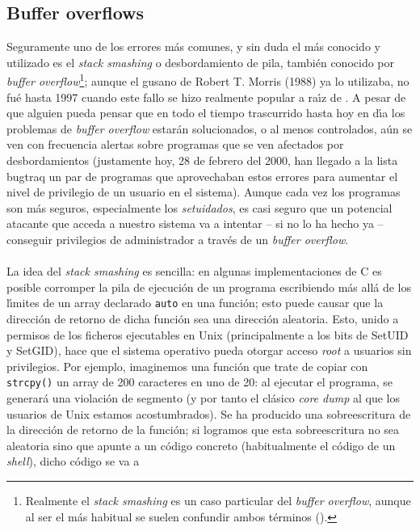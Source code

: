 \subsection{Buffer overflows}
Seguramente uno de los errores m\'as comunes, y sin duda el m\'as conocido y
utilizado es el {\it stack smashing} o desbordamiento de pila, tambi\'en 
conocido por {\it buffer overflow}\footnote{Realmente el {\it stack smashing} es
un caso particular del {\it buffer overflow}, aunque al ser el m\'as habitual
se suelen confundir ambos t\'erminos (\cite{kn:cow98}).}; aunque el gusano
de Robert T. Morris (1988) ya lo utilizaba, no fu\'e hasta 1997 cuando este
fallo se hizo realmente popular a ra\'{\i}z de \cite{kn:ale97}. A pesar de que
alguien pueda pensar que en todo el tiempo trascurrido hasta hoy en d\'{\i}a 
los problemas de {\it buffer overflow} estar\'an solucionados, o al menos 
controlados, a\'un se ven con frecuencia alertas sobre programas que se
ven afectados por desbordamientos (justamente hoy, 28 de febrero del 2000, han
llegado a la lista {\sc bugtraq} un par de
programas que aprovechaban estos errores para aumentar el nivel de privilegio
de un usuario en el sistema). Aunque cada vez los programas son m\'as seguros,
especialmente los {\it setuidados}, es casi seguro que un potencial atacante que
acceda a nuestro sistema va a intentar -- si no lo ha hecho ya -- conseguir
privilegios de administrador a trav\'es de un {\it buffer overflow}.\\
\\La idea del {\it stack smashing} es sencilla: en algunas implementaciones de
C es posible corromper la pila de ejecuci\'on de un programa escribiendo 
m\'as all\'a de los l\'{\i}mites de un array declarado {\tt auto} en una 
funci\'on; esto puede causar que la direcci\'on de retorno de dicha funci\'on 
sea una direcci\'on aleatoria. Esto, unido a permisos de los ficheros 
ejecutables en Unix (principalmente a los bits de SetUID y SetGID), hace que
el sistema operativo pueda otorgar acceso {\it root} a usuarios sin
privilegios. Por ejemplo, imaginemos una funci\'on que trate de copiar con
{\tt strcpy()} un array de 200 caracteres en uno de 20: al ejecutar el programa,
se generar\'a una violaci\'on de segmento (y por tanto el cl\'asico {\it 
core dump} al que los usuarios de Unix estamos acostumbrados). Se ha producido
una sobreescritura de la direcci\'on de retorno de la funci\'on; si logramos
que esta sobreescritura no sea aleatoria sino que apunte a un c\'odigo
concreto (habitualmente el c\'odigo de un {\it shell}), dicho c\'odigo se va a
